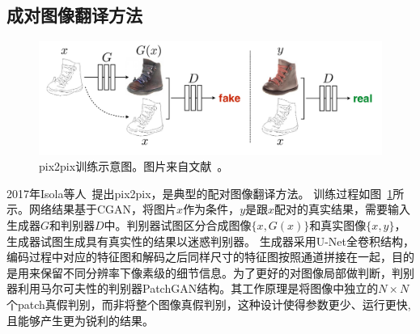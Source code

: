 \subsection{成对图像翻译方法}
\begin{figure}[htp]
    \centering
	\includegraphics[width=\textwidth]{figures/pix2pix.pdf}
	\caption{pix2pix训练示意图。图片来自文献~\cite{isola2017image}。}
	\label{fig:pix2pix}
\end{figure}

2017年Isola等人~\cite{isola2017image}提出pix2pix，是典型的配对图像翻译方法。
训练过程如图~\ref{fig:pix2pix}所示。网络结果基于CGAN，将图片$x$作为条件，$y$是跟$x$配对的真实结果，需要输入生成器$G$和判别器$D$中。判别器试图区分合成图像$\{x,G(x)\}$和真实图像$\{x,y\}$，生成器试图生成具有真实性的结果以迷惑判别器。
生成器采用U-Net全卷积结构，
编码过程中对应的特征图和解码之后同样尺寸的特征图按照通道拼接在一起，目的是用来保留不同分辨率下像素级的细节信息。为了更好的对图像局部做判断，判别器利用马尔可夫性的判别器PatchGAN结构。其工作原理是将图像中独立的$N \times N$个patch真假判别，而非将整个图像真假判别，这种设计使得参数更少、运行更快,且能够产生更为锐利的结果。





